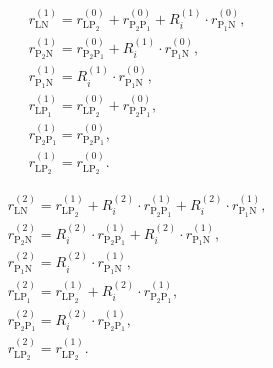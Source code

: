 \documentclass[a4paper,11pt,twoside,openright]{book}
\def\lthtmlcheckvsize{\ifdim\ht\sizebox<\vsize 
  \ifdim\wd\sizebox<\hsize\expandafter\hfill\fi \expandafter\vfill
  \else\expandafter\vss\fi}%
\begin{document}
{\newpage\clearpage
\setcounter{equation}{61}
%
\begin{subequations}\begin{align}
& r_{\textrm{LN}}^{(1)} = r_{\textrm{LP}_2}^{(0)} + r_{\textrm{P}_2 \textrm{P}_1}^{(0)} + R_i^{(1)} \cdot r_{\textrm{P}_1 \textrm{N}}^{(0)}, \\
& r_{\textrm{P}_2 \textrm{N}}^{(1)} = r_{\textrm{P}_2 \textrm{P}_1}^{(0)} + R_i^{(1)} \cdot r_{\textrm{P}_1 \textrm{N}}^{(0)} , \\
& r_{\textrm{P}_1 \textrm{N}}^{(1)} = R_i^{(1)} \cdot r_{\textrm{P}_1 \textrm{N}}^{(0)}, \\
& r_{\textrm{LP}_1}^{(1)} = r_{\textrm{LP}_2}^{(0)} + r_{\textrm{P}_2 \textrm{P}_1}^{(0)}, \\
& r_{\textrm{P}_2 \textrm{P}_1}^{(1)} = r_{\textrm{P}_2 \textrm{P}_1}^{(0)}, \\
& r_{\textrm{LP}_2}^{(1)} = r_{\textrm{LP}_2}^{(0)} .
\end{align}\end{subequations}%
\lthtmldisplayZ
\lthtmlcheckvsize\clearpage}

{\newpage\clearpage
\setcounter{equation}{62}
%
\begin{subequations}\begin{align}
& r_{\textrm{LN}}^{(2)} = r_{\textrm{LP}_2}^{(1)} + R_i^{(2)} \cdot r_{\textrm{P}_2 \textrm{P}_1}^{(1)} + R_i^{(2)} \cdot r_{\textrm{P}_1 \textrm{N}}^{(1)}, \\
& r_{\textrm{P}_2 \textrm{N}}^{(2)} = R_i^{(2)} \cdot r_{\textrm{P}_2 \textrm{P}_1}^{(1)} + R_i^{(2)} \cdot r_{\textrm{P}_1 \textrm{N}}^{(1)} , \\
& r_{\textrm{P}_1 \textrm{N}}^{(2)} = R_i^{(2)} \cdot r_{\textrm{P}_1 \textrm{N}}^{(1)}, \\
& r_{\textrm{LP}_1}^{(2)} = r_{\textrm{LP}_2}^{(1)} + R_i^{(2)} \cdot r_{\textrm{P}_2 \textrm{P}_1}^{(1)}, \\
& r_{\textrm{P}_2 \textrm{P}_1}^{(2)} = R_i^{(2)} \cdot r_{\textrm{P}_2 \textrm{P}_1}^{(1)}, \\
& r_{\textrm{LP}_2}^{(2)} = r_{\textrm{LP}_2}^{(1)} .
\end{align}\end{subequations}%
\lthtmldisplayZ
\lthtmlcheckvsize\clearpage}
\end{document}
